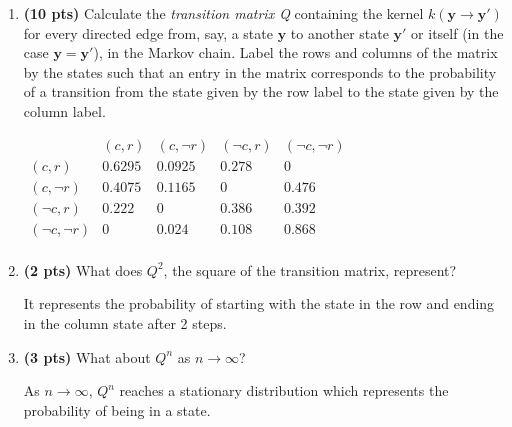 \documentclass{article}
\begin{document}
\begin{enumerate}
\begin{enumerate}[label=($\alph*$)]

    \item \textbf{(10 pts)} Calculate the \textit{transition matrix Q} containing the kernel $k(\mathbf{y} \rightarrow \mathbf{y'})$ for every directed edge from, say, a state $\mathbf{y}$ to another state $\mathbf{y'}$ or itself (in the case $\mathbf{y} = \mathbf{y'}$), in the Markov chain. Label the rows and columns of the matrix by the states such that an entry in the matrix corresponds to the probability of a transition from the state given by the row label to the state given by the column label.

    \color{blue}
        $\begin{matrix}
        & (c, r) & (c, \neg r) & (\neg c, r) & (\neg c, \neg r)\\
        (c, r) & 0.6295 & 0.0925 & 0.278 & 0\\
        (c, \neg r) & 0.4075 & 0.1165 & 0 & 0.476\\
        (\neg c, r) & 0.222 & 0 & 0.386 & 0.392\\
        (\neg c, \neg r) & 0 & 0.024 & 0.108 & 0.868\\
        \end{matrix}$
    \color{black}



    \item \textbf{(2 pts)} What does $Q^2$, the square of the transition matrix, represent?

    \color{blue}
        It represents the probability of starting with the state in the row and ending in the column state after 2 steps.
    \color{black}



    \item \textbf{(3 pts)} What about $Q^n$ as $n \rightarrow \infty$?

    \color{blue}
        As $n \rightarrow \infty$, $Q^n$ reaches a stationary distribution which represents the probability of being in a state.
    \color{black}


\end{enumerate}
\end{enumerate}
\end{document}
